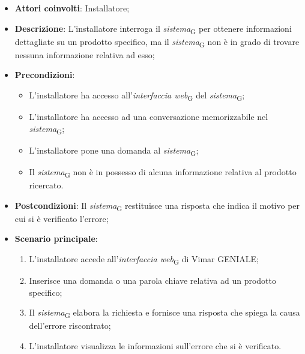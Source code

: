 \begin{itemize}
    \item \textbf{Attori coinvolti}: Installatore;
    \item \textbf{Descrizione}: L’installatore interroga il \textit{sistema}\textsubscript{G} per ottenere informazioni dettagliate su un prodotto specifico, ma il \textit{sistema}\textsubscript{G} non è in grado di trovare nessuna informazione relativa ad esso;
    \item \textbf{Precondizioni}: 
    \begin{itemize}
        \item L’installatore ha accesso all’\textit{interfaccia web}\textsubscript{G} del \textit{sistema}\textsubscript{G};
        \item L’installatore ha accesso ad una conversazione memorizzabile nel \textit{sistema}\textsubscript{G};
        \item L’installatore pone una domanda al \textit{sistema}\textsubscript{G};
        \item Il \textit{sistema}\textsubscript{G} non è in possesso di alcuna informazione relativa al prodotto ricercato.
    \end{itemize}
    \item \textbf{Postcondizioni}: Il \textit{sistema}\textsubscript{G} restituisce una risposta che indica il motivo per cui si è verificato l’errore;
    \item \textbf{Scenario principale}:
    \begin{enumerate}
        \item L’installatore accede all’\textit{interfaccia web}\textsubscript{G} di Vimar GENIALE;
        \item Inserisce una domanda o una parola chiave relativa ad un prodotto specifico;
        \item Il \textit{sistema}\textsubscript{G} elabora la richiesta e fornisce una risposta che spiega la causa dell'errore riscontrato;
        \item L’installatore visualizza le informazioni sull’errore che si è verificato.
    \end{enumerate}
\end{itemize}



